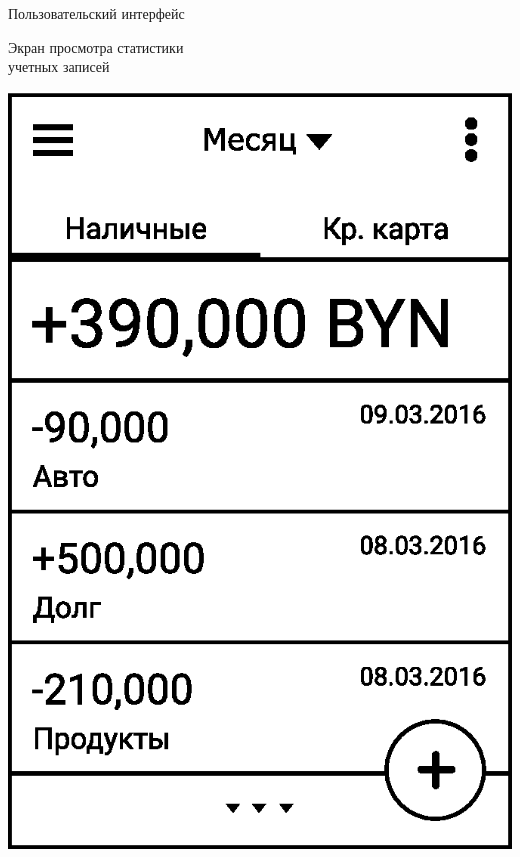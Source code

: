 \documentclass[russian,utf8,a1paper,nostitching,simple]{eskdgraph}
\begin{document}
\begin{ESKDdrawing}
  \centering
  {\fontsize{50}{60}\selectfont Пользовательский интерфейс}

  \vspace{1.7cm}
  \begin{minipage}{28cm}
    \centering
    {\fontsize{40}{50}\selectfont Экран просмотра статистики \\ учетных записей}

    \vspace{2cm}
    \begin{minipage}{10cm}
      \vspace{4.5cm}
      \raggedleft

      \vspace{11.5cm}
      \raggedleft

      \vspace{2cm}
    \end{minipage}
    \hfill
    \begin{minipage}{7.5cm}
      \centering

      \vspace{1cm}
      \centering
      \includegraphics[width=\linewidth]{fig/ui_activities_balance_text_chrono.eps}


\end{minipage}
\end{minipage}
\end{ESKDdrawing}
\end{document}
